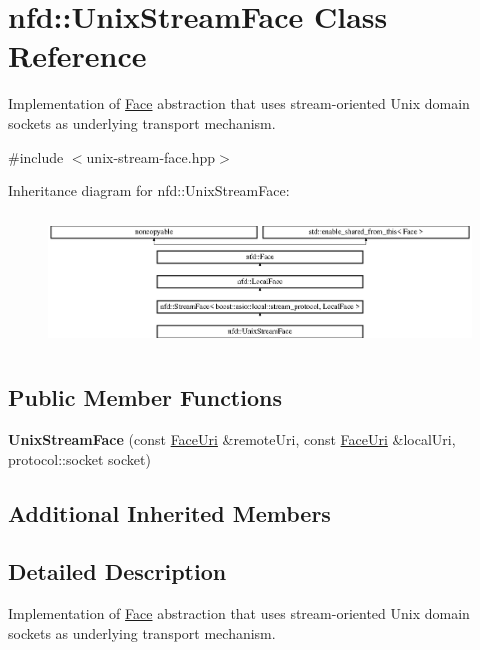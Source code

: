\hypertarget{classnfd_1_1UnixStreamFace}{}\section{nfd\+:\+:Unix\+Stream\+Face Class Reference}
\label{classnfd_1_1UnixStreamFace}


Implementation of \hyperlink{classnfd_1_1Face}{Face} abstraction that uses stream-\/oriented Unix domain sockets as underlying transport mechanism.  




{\ttfamily \#include $<$unix-\/stream-\/face.\+hpp$>$}

Inheritance diagram for nfd\+:\+:Unix\+Stream\+Face\+:\begin{figure}[H]
\begin{center}
\leavevmode
\includegraphics[height=3.562341cm]{classnfd_1_1UnixStreamFace}
\end{center}
\end{figure}
\subsection*{Public Member Functions}
\begin{DoxyCompactItemize}
\item 
{\bfseries Unix\+Stream\+Face} (const \hyperlink{classndn_1_1util_1_1FaceUri}{Face\+Uri} \&remote\+Uri, const \hyperlink{classndn_1_1util_1_1FaceUri}{Face\+Uri} \&local\+Uri, protocol\+::socket socket)\hypertarget{classnfd_1_1UnixStreamFace_aef8c0cfd38a4a772036bc478d5ac3a3f}{}\label{classnfd_1_1UnixStreamFace_aef8c0cfd38a4a772036bc478d5ac3a3f}

\end{DoxyCompactItemize}
\subsection*{Additional Inherited Members}


\subsection{Detailed Description}
Implementation of \hyperlink{classnfd_1_1Face}{Face} abstraction that uses stream-\/oriented Unix domain sockets as underlying transport mechanism. 

